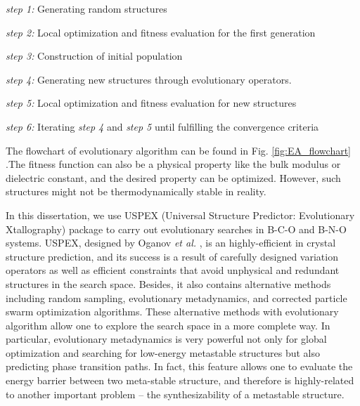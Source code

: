 {\vspace{16pt}}

{\it step 1:} Generating random structures

{\it step 2:} Local optimization and fitness evaluation for the first generation

{\it step 3:} Construction of initial population

{\it step 4:} Generating new structures through evolutionary operators.

{\it step 5:} Local optimization and fitness evaluation for new structures 

{\it step 6:} Iterating {\it step 4} and {\it step 5} until fulfilling the convergence criteria

{\vspace{16pt}}


    

The flowchart of evolutionary algorithm can be found in Fig. \ref{fig:EA_flowchart} .The fitness function can also be a physical property like the bulk modulus or dielectric constant, and the desired property can be optimized. However, such structures might not be thermodynamically stable in reality.


In this dissertation, we use \textsc{USPEX} (Universal Structure Predictor: Evolutionary Xtallography) package to carry out evolutionary searches in B-C-O and B-N-O systems. \textsc{USPEX}, designed by Oganov {\it et al.} \cite{oganov2006crystal, glass2006uspex, lyakhov2013new}, is an highly-efficient in crystal structure prediction, and its success is a result of carefully designed variation operators as well as efficient constraints that avoid unphysical and redundant structures in the search space. Besides, it also contains alternative methods including
random sampling, evolutionary metadynamics, and corrected particle swarm optimization algorithms. These alternative methods with evolutionary algorithm allow one to explore the search space in a more complete way.
In particular, evolutionary metadynamics is very powerful not only for global optimization and searching for low-energy metastable structures but also  predicting phase transition paths. In fact, this feature allows one to evaluate the energy barrier between two meta-stable structure, and therefore is highly-related to another important problem -- the synthesizability of a metastable structure.

